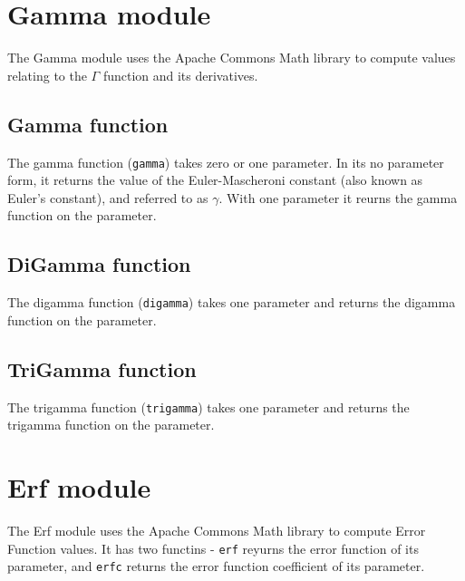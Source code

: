 \section{Gamma module}
The Gamma module uses the Apache Commons Math library to compute values relating to the $\Gamma$ function and its derivatives.
\subsection{Gamma function}
The gamma function (\Verb+gamma+) takes zero or one parameter. In its no parameter form, it returns the value of the Euler-Mascheroni constant (also known as Euler's constant), and referred to as $\gamma$. With one parameter it reurns the gamma function on the parameter.
\subsection{DiGamma function}
The digamma function (\Verb+digamma+) takes one parameter and returns the digamma function on the parameter.
\subsection{TriGamma function}
The trigamma function (\Verb+trigamma+) takes one parameter and returns the trigamma function on the parameter.
\section{Erf module}
The Erf module uses the Apache Commons Math library to compute Error Function values. It has two functins - \Verb+erf+ reyurns the error function of its parameter, and \verb+erfc+ returns the error function coefficient of its parameter.
